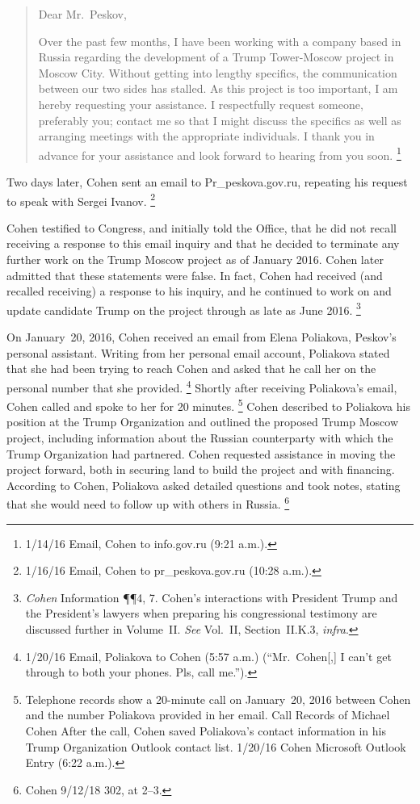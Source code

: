 \begin{quote}
Dear Mr.~Peskov,

Over the past few months, I have been working with a company based in Russia regarding the development of a Trump Tower-Moscow project in Moscow City.
Without getting into lengthy specifics, the communication between our two sides has stalled.
As this project is too important, I am hereby requesting your assistance.
I respectfully request someone, preferably you; contact me so that I might discuss the specifics as well as arranging meetings with the appropriate individuals.
I thank you in advance for your assistance and look forward to hearing from you soon.%
\footnote{1/14/16 Email, Cohen to info\@prpress.gov.ru (9:21 a.m.).}
\end{quote}

Two days later, Cohen sent an email to Pr\_peskova\@prpress.gov.ru, repeating his request to speak with Sergei Ivanov.%
\footnote{1/16/16 Email, Cohen to pr\_peskova\@prpress.gov.ru (10:28 a.m.).}

Cohen testified to Congress, and initially told the Office, that he did not recall receiving a response to this email inquiry and that he decided to terminate any further work on the Trump Moscow project as of January 2016.
Cohen later admitted that these statements were false.
In fact, Cohen had received (and recalled receiving) a response to his inquiry, and he continued to work on and update candidate Trump on the project through as late as June 2016.%
\footnote{\textit{Cohen} Information \P\P 4, 7.
Cohen's interactions with President Trump and the President's lawyers when preparing his congressional testimony are discussed further in Volume~II\null.
\textit{See} Vol.~II, Section~II.K.3, \textit{infra}.}

On January~20, 2016, Cohen received an email from Elena Poliakova, Peskov's personal assistant.
Writing from her personal email account, Poliakova stated that she had been trying to reach Cohen and asked that he call her on the personal number that she provided.%
\footnote{1/20/16 Email, Poliakova to Cohen (5:57 a.m.)
(“Mr.~Cohen[,] I can't get through to both your phones. Pls, call me.”).}
Shortly after receiving Poliakova's email, Cohen called and spoke to her for 20 minutes.%
\footnote{Telephone records show a 20-minute call on January~20, 2016 between Cohen and the number Poliakova provided in her email.
Call Records of Michael Cohen 
After the call, Cohen saved Poliakova's contact information in his Trump Organization Outlook contact list.
1/20/16 Cohen Microsoft Outlook Entry (6:22 a.m.).}
Cohen described to Poliakova his position at the Trump Organization and outlined the proposed Trump Moscow project, including information about the Russian counterparty with which the Trump Organization had partnered.
Cohen requested assistance in moving the project forward, both in securing land to build the project and with financing.
According to Cohen, Poliakova asked detailed questions and took notes, stating that she would need to follow up with others in Russia.%
\footnote{Cohen 9/12/18 302, at 2--3.}

